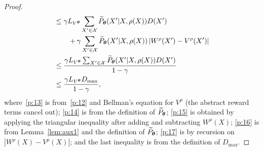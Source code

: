\begin{proof}
\begin{align}
	&\leq \gamma L_{V^{\boldsymbol{\theta}}}\sum_{X'\in\mathcal{X}}\widetilde{P}_{\boldsymbol{\theta}}(X'|X,\rho(X))D(X')
	\nonumber\\&\qquad + 
	\gamma \sum_{X'\in\mathcal{X}}\widetilde{P}_{\boldsymbol{\theta}}(X'|X,\rho(X))\left|W^{\rho}(X') - V^{\rho}(X')\right| \label{p:16}\\
	&\leq \frac{\gamma L_{V^{\boldsymbol{\theta}}}\sum_{X'\in\mathcal{X}}\widetilde{P}_{\boldsymbol{\theta}}(X'|X,\rho(X))D(X')}{1-\gamma} \label{p:17}\\
	&\leq \frac{\gamma L_{V^{\boldsymbol{\theta}}}D_{\max}}{1-\gamma},\nonumber
	\end{align}
	where~\eqref{p:13} is from~\eqref{p:12} and Bellman's equation for $V^{\rho}$ (the abstract reward terms cancel out); \eqref{p:14} is from the definition of $\widetilde{P}_{\boldsymbol{\theta}}$; \eqref{p:15} is obtained by applying the triangular inequality after adding and subtracting $W^{\rho}(X)$; \eqref{p:16} is from Lemma~\ref{lem:aux1} and the definition of $\widetilde{P}_{\boldsymbol{\theta}}$; \eqref{p:17} is by recursion on $\left|W^{\rho}(X)-V^{\rho}(X)\right|$; and the last inequality is from the definition of $D_{\max}$.
\end{proof}